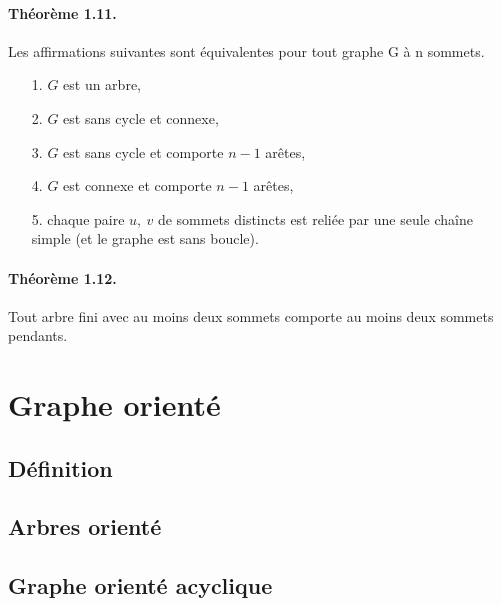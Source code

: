 \paragraph*{Théorème 1.11.}
Les affirmations suivantes sont équivalentes pour tout graphe G à n sommets.
\begin{itemize}
	\item[1.] $ G $ est un arbre,
	\item[2.] $ G $ est sans cycle et connexe,
	\item[3.] $ G $ est sans cycle et comporte $ n - 1 $ arêtes,
	\item[4.] $ G $ est connexe et comporte $ n - 1 $ arêtes,
	\item[5.] chaque paire $ u,\ v $ de sommets distincts est reliée par une seule chaîne simple (et
	le graphe est sans boucle).
\end{itemize}

\paragraph*{Théorème 1.12.}
Tout arbre fini avec au moins deux sommets comporte au moins deux sommets
pendants.

\section{Graphe orienté}
\subsection{Définition}

\subsection{Arbres orienté}

\subsection{Graphe orienté acyclique}


